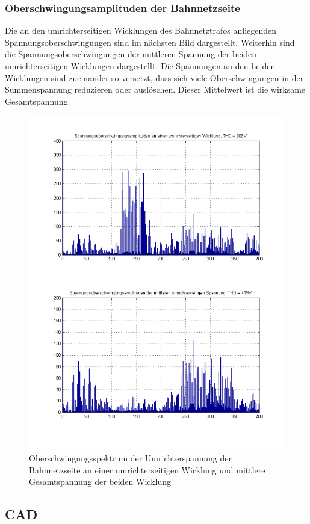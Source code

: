 \subsubsection{Oberschwingungsamplituden der Bahnnetzseite}
Die an den umrichterseitigen Wicklungen des Bahnnetztrafos anliegenden Spannungsoberschwingungen sind im nächsten Bild dargestellt. Weiterhin sind die Spannungsoberschwingungen der mittleren Spannung der beiden umrichterseitigen Wicklungen dargestellt. Die Spannungen an den beiden Wicklungen sind zueinander so versetzt, dass sich viele Oberschwingungen in der Summenspannung reduzieren oder auslöschen. Dieser Mittelwert ist die wirksame Gesamtspannung. 

\begin{figure}[htb]
    \centering
    \includegraphics[width=\textwidth]{Bilder/oberschwingungsamp_umrichterseite.png}     
    \caption{Oberschwingungsspektrum der Umrichterspannung der Bahnnetzseite an einer umrichterseitigen Wicklung und mittlere Gesamtspannung der beiden Wicklung}
\end{figure}
\clearpage
\subsection{CAD}


